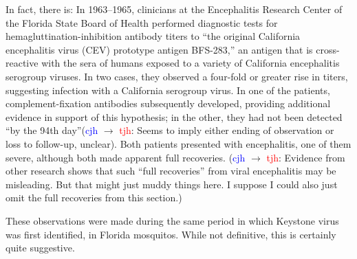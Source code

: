 \documentclass[12pt]{article}
\newcommand{\cjh}{\textcolor{blue}{cjh}}
\newcommand{\tjh}{\textcolor{red}{tjh}}
\newcommand{\msg}[3]{(#1 $\rightarrow$ #2: #3)}
\newcommand{\mcc}[1]{\msg\cjh\cjh{#1}}
\newcommand{\mct}[1]{\msg\cjh\tjh{#1}}
\begin{document}
        In fact, there is: In 1963--1965, clinicians at the Encephalitis Research Center of the Florida State Board of Health performed diagnostic tests for hemagluttination-inhibition antibody titers to ``the original California encephalitis virus (CEV) prototype antigen BFS-283,'' an antigen that is cross-reactive with the sera of humans exposed to a variety of California encephalitis serogroup viruses. In two cases, they observed a four-fold or greater rise in titers, suggesting infection with a California serogroup virus. In one of the patients, complement-fixation antibodies subsequently developed, providing additional evidence in support of this hypothesis; in the other, they had not been detected ``by the 94th day''\mct{Seems to imply either ending of observation or loss to follow-up, unclear}. Both patients presented with encephalitis, one of them severe, although both made apparent full recoveries.\cite{bond1966california} \mct{Evidence from other research shows that such ``full recoveries'' from viral encephalitis may be misleading. But that might just muddy things here. I suppose I could also just omit the full recoveries from this section.}

    These observations were made during the same period in which Keystone virus was first identified, in Florida mosquitos.\cite{bond1966california} While not definitive, this is certainly quite suggestive. %
    
\end{document}

